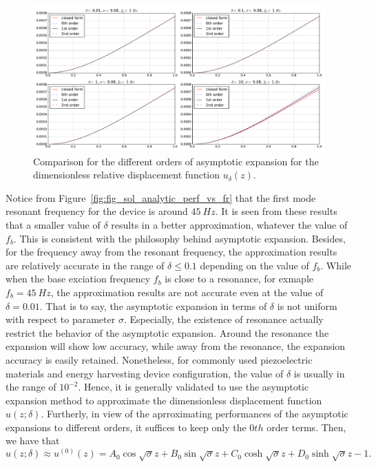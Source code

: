 \documentclass{article}
\begin{document}
\begin{figure}[!htbp]
    \centering
    \includegraphics[width=\textwidth]{./img_eig_asy/fig_sol_analytic_disp_cmp_fr001}
    \caption{Comparison for the different orders of asymptotic expansion for the dimensionless relative displacement function $u_\delta(z)$.}
    \label{fig:fig_sol_analytic_disp_cmp_fr001}
\end{figure}



Notice from Figure~\ref{fig:fig_sol_analytic_perf_vs_fr} that the first mode resonant frequency for the device is around $45\ Hz$. It is seen from these results that a smaller value of $\delta$ results in a better approximation, whatever the value of $f_b$. This is consistent with the philosophy behind asymptotic expansion. Besides, for the frequency away from the resonant frequency, the approximation results are relatively accurate in the range of $\delta \leq 0.1$ depending on the value of $f_b$. While when the base exciation frequency $f_b$ is close to a resonance, for exmaple $f_b = 45\ Hz$, the approximation results are not accurate even at the value of $\delta = 0.01$. That is to say, the asymptotic expansion in terms of $\delta$ is not uniform with respect to parameter $\sigma$. Especially, the existence of resonance actually restrict the behavior of the asymptotic expansion. Around the resonance the expansion will show low accuracy, while away from the resonance, the expansion accuracy is easily retained. Nonetheless, for commonly used piezoelectric materials and energy harvesting device configuration, the value of $\delta$ is usually in the range of $10^{-2}$. Hence, it is generally validated to use the asymptotic expansion method to approximate the dimensionless displacement function $u(z;\delta)$. Furtherly, in view of the aprroximating performances of the asymptotic expansions to different orders, it suffices to keep only the $0th$ order terms. Then, we have that 
\begin{equation}
    u(z;\delta) \approx u^{(0)}(z) = A_0 \cos{\sqrt{\sigma}z} + B_0 \sin{\sqrt{\sigma}z} + C_0 \cosh{\sqrt{\sigma}z} + D_0 \sinh{\sqrt{\sigma}z} - 1.
\end{equation}
\end{document}
